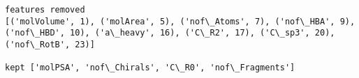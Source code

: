 \documentclass[11pt]{article}
\begin{document}
    \begin{Verbatim}[commandchars=\\\{\}]
features removed
[('molVolume', 1), ('molArea', 5), ('nof\_Atoms', 7), ('nof\_HBA', 9), ('nof\_HBD', 10), ('a\_heavy', 16), ('C\_R2', 17), ('C\_sp3', 20), ('nof\_RotB', 23)]

kept ['molPSA', 'nof\_Chirals', 'C\_R0', 'nof\_Fragments']

    \end{Verbatim}


    
    
    
    
\end{document}
